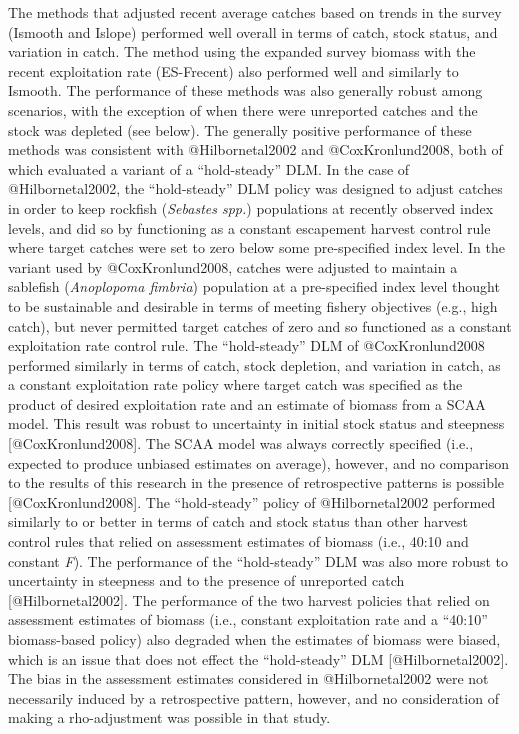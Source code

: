 \documentclass[
  12pt,
]{article}
\begin{document}
The methods that adjusted recent average catches based on trends in the survey (Ismooth and Islope) performed well overall in terms of catch, stock status, and variation in catch. The method using the expanded survey biomass with the recent exploitation rate (ES-Frecent) also performed well and similarly to Ismooth. The performance of these methods was also generally robust among scenarios, with the exception of when there were unreported catches and the stock was depleted (see below). The generally positive performance of these methods was consistent with @Hilbornetal2002 and @CoxKronlund2008, both of which evaluated a variant of a ``hold-steady'' DLM. In the case of @Hilbornetal2002, the ``hold-steady'' DLM policy was designed to adjust catches in order to keep rockfish (\emph{Sebastes spp.}) populations at recently observed index levels, and did so by functioning as a constant escapement harvest control rule where target catches were set to zero below some pre-specified index level. In the variant used by @CoxKronlund2008, catches were adjusted to maintain a sablefish (\emph{Anoplopoma fimbria}) population at a pre-specified index level thought to be sustainable and desirable in terms of meeting fishery objectives (e.g., high catch), but never permitted target catches of zero and so functioned as a constant exploitation rate control rule. The ``hold-steady'' DLM of @CoxKronlund2008 performed similarly in terms of catch, stock depletion, and variation in catch, as a constant exploitation rate policy where target catch was specified as the product of desired exploitation rate and an estimate of biomass from a SCAA model. This result was robust to uncertainty in initial stock status and steepness {[}@CoxKronlund2008{]}. The SCAA model was always correctly specified (i.e., expected to produce unbiased estimates on average), however, and no comparison to the results of this research in the presence of retrospective patterns is possible {[}@CoxKronlund2008{]}. The ``hold-steady'' policy of @Hilbornetal2002 performed similarly to or better in terms of catch and stock status than other harvest control rules that relied on assessment estimates of biomass (i.e., 40:10 and constant \emph{F}). The performance of the ``hold-steady'' DLM was also more robust to uncertainty in steepness and to the presence of unreported catch {[}@Hilbornetal2002{]}. The performance of the two harvest policies that relied on assessment estimates of biomass (i.e., constant exploitation rate and a ``40:10'' biomass-based policy) also degraded when the estimates of biomass were biased, which is an issue that does not effect the ``hold-steady'' DLM {[}@Hilbornetal2002{]}. The bias in the assessment estimates considered in @Hilbornetal2002 were not necessarily induced by a retrospective pattern, however, and no consideration of making a rho-adjustment was possible in that study.
\end{document}
